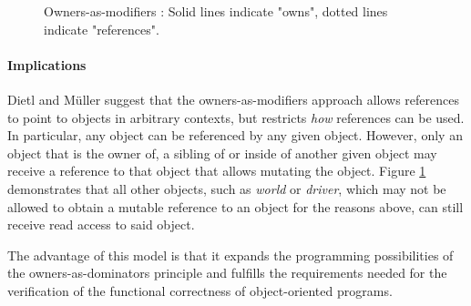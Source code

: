 \documentclass[sigplan,11pt,nonacm]{acmart}
\begin{document}
\begin{figure}

  \caption{Owners-as-modifiers \cite{ownership-types-survey}: Solid lines indicate "owns", dotted lines indicate "references".}
  \label{fig:owners-as-modifiers}
\end{figure}

\paragraph{Implications}

Dietl and Müller \cite{lightweight-ownership} suggest that the owners-as-modifiers approach allows references to point to objects in arbitrary contexts, but restricts \emph{how} references can be used.
In particular, any object can be referenced by any given object.
However, only an object that is the owner of, a sibling of or inside of another given object may receive a reference to that object that allows mutating the object.
Figure \ref{fig:owners-as-modifiers} demonstrates that all other objects, such as \emph{world} or \emph{driver}, which may not be allowed to obtain a mutable reference to an object for the reasons above, can still receive read access to said object.

The advantage of this model is that it expands the programming possibilities of the owners-as-dominators principle and fulfills the requirements needed for the verification of the functional correctness of object-oriented programs. \cite{ownership-types-survey}
\end{document}
